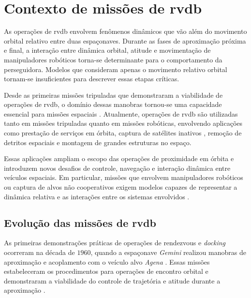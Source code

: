 \section{Contexto de missões de \gls{rvdb}}

As operações de \gls{rvdb} envolvem fenômenos dinâmicos que vão além do movimento orbital relativo entre duas espaçonaves. Durante as fases de aproximação próxima e final, a interação entre dinâmica orbital, atitude e movimentação de manipuladores robóticos torna-se determinante para o comportamento da perseguidora. Modelos que consideram apenas o movimento relativo orbital tornam-se insuficientes para descrever essas etapas críticas.

Desde as primeiras missões tripuladas que demonstraram a viabilidade de operações de \gls{rvdb}, o domínio dessas manobras tornou-se uma capacidade essencial para missões espaciais \cite{nasa1stDocking}.
Atualmente, operações de \gls{rvdb} são utilizadas tanto em missões tripuladas quanto em missões robóticas, envolvendo aplicações como prestação de serviços em órbita, captura de satélites inativos \cite{mev_northrop}, remoção de detritos espaciais e montagem de grandes estruturas no espaço.

Essas aplicações ampliam o escopo das operações de proximidade em órbita e introduzem novos desafios de controle, navegação e interação dinâmica entre veículos espaciais.
Em particular, missões que envolvem manipuladores robóticos ou captura de alvos não cooperativos exigem modelos capazes de representar a dinâmica relativa e as interações entre os sistemas envolvidos \cite{papadopoulos1994free,flores2014review}.

\subsection{Evolução das missões de \gls{rvdb}}

As primeiras demonstrações práticas de operações de rendezvous e \textit{docking} ocorreram na década de $1960$, quando a espaçonave \emph{Gemini} realizou manobras de aproximação e acoplamento com o veículo alvo \emph{Agena} \cite{nasa1stDocking}.
Essas missões estabeleceram os procedimentos para operações de encontro orbital e demonstraram a viabilidade do controle de trajetória e atitude durante a aproximação \cite{goodman2011rendezvous}.

